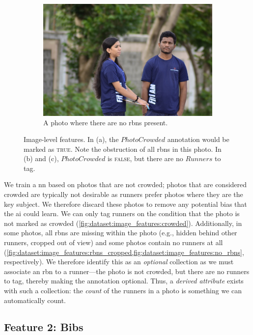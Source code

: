 \begin{figure}[th]
\begin{subfigure}[b]{0.4\textwidth}
    \includegraphics[width=\textwidth]{images/dataset/ImageFeatures_Optional_NoRBNs}
    \caption{\footnotesize A photo where there are no \glspl{rbn} present.}
    \label{fig:dataset:image_features:no_rbns}
  \end{subfigure} 
  \caption[Various image-level features]{Image-level features. In (a), the $PhotoCrowded$ annotation would be marked as \textsc{true}. Note the obstruction of all \glspl{rbn} in this photo. In (b) and (c), $PhotoCrowded$ is \textsc{false}, but there are no $Runners$ to tag.}
  \label{fig:dataset:image_features}
\end{figure}

We train a \gls{nn} based on photos that are not crowded; photos that are considered crowded are typically not desirable as runners prefer photos where they are the key subject. We therefore discard these photos to remove any potential bias that the \gls{ai} could learn. We can only tag runners on the condition that the photo is not marked as crowded (\cref{fig:dataset:image_features:crowded}). Additionally, in some photos, all \glspl{rbn} are missing within the photo (e.g., hidden behind other runners, cropped out of view) and some photos contain no runners at all (\cref{fig:dataset:image_features:rbns_cropped,fig:dataset:image_features:no_rbns}, respectively). We therefore identify this as an \textit{optional} collection as we must associate an \gls{rbn} to a runner---the photo is not crowded, but there are no runners to tag, thereby making the annotation optional. Thus, a \textit{derived attribute} exists with such a collection: the \textit{count} of the runners in a photo is something we can automatically count.

\subsection{Feature 2: Bibs}

